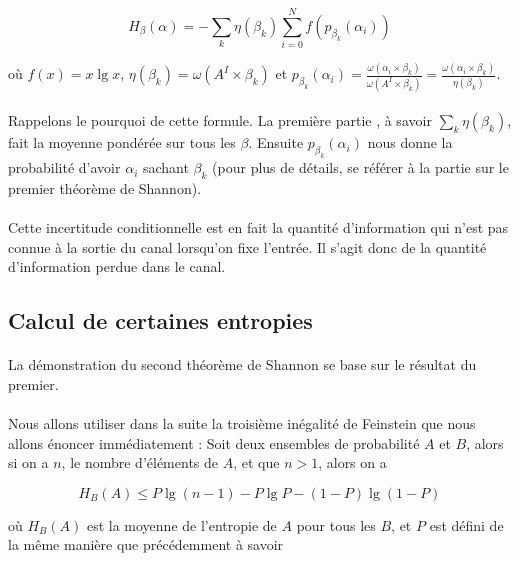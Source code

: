 	\[
		H_\beta(\alpha) =
		- \sum_k\eta(\beta_k)\sum_{i=0}^Nf(p_{\beta_k}(\alpha_i))
	\]
	
	où $f(x) = x \lg x$, $\eta(\beta_k) = \omega(A^I \times \beta_k)$
	et 
		$p_{\beta_k}(\alpha_i) = 
		\frac{\omega(\alpha_i \times \beta_k)}{\omega(A^I \times \beta_k)}=
		\frac{\omega(\alpha_i \times \beta_k)}{\eta(\beta_k)}$.
	\paragraph{}
	Rappelons le pourquoi de cette formule. La première partie , à savoir
	$\sum_k\eta(\beta_k)$, fait la moyenne pondérée sur tous les $\beta$.
	Ensuite $p_{\beta_k}(\alpha_i)$ nous donne la probabilité d'avoir 
	$\alpha_i$ sachant $\beta_k$ (pour plus de détails, se référer à la partie
	sur le premier théorème de Shannon).
	
	
	
	\paragraph{}
	Cette incertitude conditionnelle est en fait la quantité d'information
	qui n'est pas connue à la sortie du canal lorsqu'on fixe l'entrée. Il 
	s'agit donc de la quantité d'information perdue dans le canal.
	
\subsection*{Calcul de certaines entropies}

	\paragraph{}
	La démonstration du second théorème de Shannon se base sur le 
	résultat du premier. 
	
	\paragraph{}
	Nous allons utiliser dans la suite la troisième inégalité de Feinstein 
	que nous allons énoncer immédiatement :
	Soit deux ensembles de probabilité $A$ et $B$, alors si on a $n$, le 
	nombre d'éléments de $A$, et que $n>1$, alors on a 
	
	\[H_B(A)\le P\lg (n-1) - P\lg P - (1-P)\lg(1-P)\]
	
	
	où $H_B(A)$ est la moyenne de l'entropie de $A$ pour tous
	les $B$, et $P$ est défini de la même manière que précédemment à savoir
	
